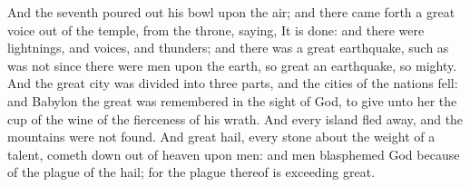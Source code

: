  And the seventh poured out his bowl upon the air; and there came forth a great voice out of the temple, from the throne, saying, It is done: 
 and there were lightnings, and voices, and thunders; and there was a great earthquake, such as was not since there were men upon the earth, so great an earthquake, so mighty. 
 And the great city was divided into three parts, and the cities of the nations fell: and Babylon the great was remembered in the sight of God, to give unto her the cup of the wine of the fierceness of his wrath. 
 And every island fled away, and the mountains were not found. 
 And great hail, every stone about the weight of a talent, cometh down out of heaven upon men: and men blasphemed God because of the plague of the hail; for the plague thereof is exceeding great.